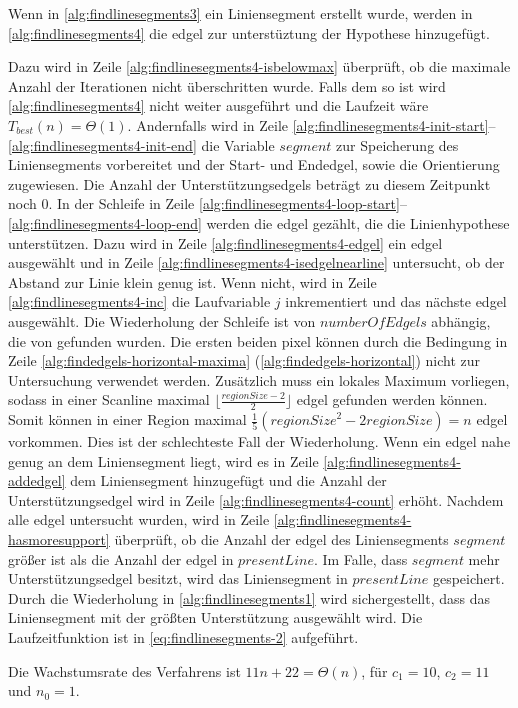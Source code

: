 Wenn in \autoref{alg:findlinesegments3} ein Liniensegment erstellt wurde, werden in \autoref{alg:findlinesegments4} die
 \gls{edgel} zur unterstüztung der Hypothese hinzugefügt.

Dazu wird in Zeile \ref{alg:findlinesegments4-isbelowmax} überprüft, ob die maximale Anzahl der Iterationen nicht
 überschritten wurde. Falls dem so ist wird \autoref{alg:findlinesegments4} nicht weiter ausgeführt und die Laufzeit
 wäre $T_{best}(n) = \Theta(1)$. Andernfalls wird in Zeile
 \ref{alg:findlinesegments4-init-start}--\ref{alg:findlinesegments4-init-end} die Variable $\mathit{segment}$ zur
 Speicherung des Liniensegments vorbereitet und der Start- und Endedgel, sowie die Orientierung zugewiesen. Die Anzahl
 der Unterstützungsedgels beträgt zu diesem Zeitpunkt noch $0$. In der Schleife in Zeile
 \ref{alg:findlinesegments4-loop-start}--\ref{alg:findlinesegments4-loop-end} werden die \gls{edgel} gezählt, die die
 Linienhypothese unterstützen. Dazu wird in Zeile \ref{alg:findlinesegments4-edgel} ein \gls{edgel} ausgewählt und in
 Zeile \ref{alg:findlinesegments4-isedgelnearline} untersucht, ob der Abstand zur Linie klein genug ist. Wenn nicht,
 wird in Zeile \ref{alg:findlinesegments4-inc} die Laufvariable $j$ inkrementiert und das nächste \gls{edgel}
 ausgewählt. Die Wiederholung der Schleife ist von $\mathit{numberOfEdgels}$ abhängig, die von 
 gefunden wurden. Die ersten beiden \gls{pixel} können durch die Bedingung in Zeile
 \ref{alg:findedgels-horizontal-maxima} (\autoref{alg:findedgels-horizontal}) nicht zur Untersuchung verwendet werden.
 Zusätzlich muss ein lokales Maximum vorliegen, sodass in einer Scanline maximal
 $\bigl\lfloor\tfrac{\mathit{regionSize}-2}{2}\bigr\rfloor$ \gls{edgel} gefunden werden können. Somit können in einer
 Region maximal $\tfrac{1}{5}(\mathit{regionSize}^2 -2\mathit{regionSize}) = n$ \gls{edgel} vorkommen. Dies ist der
 schlechteste Fall der Wiederholung. Wenn ein \gls{edgel} nahe genug an dem Liniensegment liegt, wird es in Zeile
 \ref{alg:findlinesegments4-addedgel} dem Liniensegment hinzugefügt und die Anzahl der Unterstützungsedgel wird in
 Zeile \ref{alg:findlinesegments4-count} erhöht. Nachdem alle \gls{edgel} untersucht wurden, wird in Zeile
 \ref{alg:findlinesegments4-hasmoresupport} überprüft, ob die Anzahl der \gls{edgel} des Liniensegments
 $\mathit{segment}$ größer ist als die Anzahl der \gls{edgel} in $\mathit{presentLine}$. Im Falle, dass
 $\mathit{segment}$ mehr Unterstützungsedgel besitzt, wird das Liniensegment in $\mathit{presentLine}$ gespeichert.
 Durch die Wiederholung in \autoref{alg:findlinesegments1} wird sichergestellt, dass das Liniensegment mit der größten
 Unterstützung ausgewählt wird. Die Laufzeitfunktion ist in \autoref{eq:findlinesegments-2} aufgeführt.

Die Wachstumsrate des Verfahrens ist $11n + 22 = \Theta(n)$, für $c_{1} = 10$, $c_{2} = 11$ und $n_{0} = 1$.

